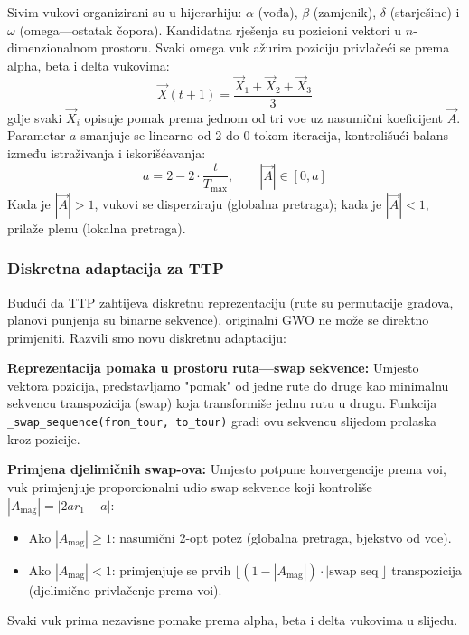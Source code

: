 \documentclass[12pt,a4paper]{article}
\begin{document}
Sivim vukovi organizirani su u hijerarhiju: $\alpha$ (vođa), $\beta$ (zamjenik), $\delta$ (starješine) i $\omega$ (omega---ostatak \v{c}opora). Kandidatna rje\v{s}enja su pozicioni vektori u $n$-dimenzionalnom prostoru. Svaki omega vuk a\v{z}urira poziciju privla\v{c}e\'{c}i se prema alpha, beta i delta vukovima:
\begin{equation}
    \vec{X}(t+1) = \frac{\vec{X}_1 + \vec{X}_2 + \vec{X}_3}{3}
\end{equation}
gdje svaki $\vec{X}_i$ opisuje pomak prema jednom od tri vo\dj{}e uz nasumi\v{c}ni koeficijent $\vec{A}$. Parametar $a$ smanjuje se linearno od 2 do 0 tokom iteracija, kontrolišu\'{c}i balans između istra\v{z}ivanja i iskori\v{s}\'{c}avanja:
\begin{equation}
    a = 2 - 2 \cdot \frac{t}{T_{\max}}, \qquad
    |\vec{A}| \in [0, a]
\end{equation}
Kada je $|\vec{A}| > 1$, vukovi se disperziraju (globalna pretraga); kada je $|\vec{A}| < 1$, prila\v{z}e plenu (lokalna pretraga).

\subsubsection{Diskretna adaptacija za TTP}

Budu\'{c}i da TTP zahtijeva diskretnu reprezentaciju (rute su permutacije gradova, planovi punjenja su binarne sekvence), originalni GWO ne mo\v{z}e se direktno primjeniti. Razvili smo novu diskretnu adaptaciju:

\textbf{Reprezentacija pomaka u prostoru ruta---swap sekvence:}
Umjesto vektora pozicija, predstavljamo "pomak" od jedne rute do druge kao minimalnu sekvencu transpozicija (swap) koja transformi\v{s}e jednu rutu u drugu. Funkcija \texttt{\_swap\_sequence(from\_tour, to\_tour)} gradi ovu sekvencu slijedom prolaska kroz pozicije.

\textbf{Primjena djelimi\v{c}nih swap-ova:}
Umjesto potpune konvergencije prema vo\dj{}i, vuk primjenjuje proporcionalni udio swap sekvence koji kontroli\v{s}e $|A_{\text{mag}}| = |2ar_1 - a|$:
\begin{itemize}
    \item Ako $|A_{\text{mag}}| \geq 1$: nasumi\v{c}ni 2-opt potez (globalna pretraga, bjekstvo od vo\dj{}e).
    \item Ako $|A_{\text{mag}}| < 1$: primjenjuje se prvih $\lfloor (1 - |A_{\text{mag}}|) \cdot |\text{swap seq}| \rfloor$ transpozicija (djelimi\v{c}no privla\v{c}enje prema vo\dj{}i).
\end{itemize}
Svaki vuk prima nezavisne pomake prema alpha, beta i delta vukovima u slijedu.
\end{document}
